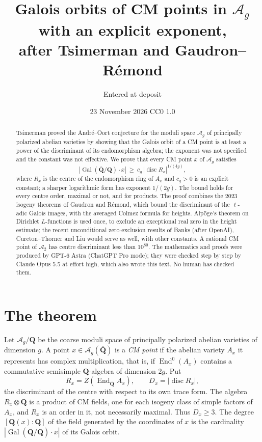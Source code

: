 \documentclass[11pt,a4paper]{article}
\title{Galois orbits of CM points in $\mathcal A_g$ with an explicit exponent,\\ after Tsimerman and Gaudron--R\'emond}
\author{Entered at deposit}
\date{23 November 2026 \quad CC0 1.0}
\theoremstyle{plain}
\theoremstyle{remark}
\newcommand{\Q}{\mathbf Q}
\newcommand{\Ag}{\mathcal A_g}
\newcommand{\Gal}{\operatorname{Gal}}
\newcommand{\End}{\operatorname{End}}
\newcommand{\disc}{\operatorname{disc}}
\newcommand{\Qb}{\overline{\mathbf Q}}
\begin{document}
\maketitle

\begin{abstract}
\noindent
Tsimerman proved the Andr\'e--Oort conjecture for the moduli space $\Ag$ of principally polarized abelian varieties
by showing that the Galois orbit of a CM point is at least a power of the discriminant of its endomorphism algebra;
the exponent was not specified and the constant was not effective. We prove that every CM point $x$ of $\Ag$ satisfies
\[
 |\Gal(\Qb/\Q)\cdot x|\ \geq\ c_g\,|\disc R_x|^{1/(4g)},
\]
where $R_x$ is the centre of the endomorphism ring of $A_x$ and $c_g>0$ is an explicit constant; a sharper logarithmic
form has exponent $1/(2g)$. The bound holds for every centre order, maximal or not, and for products. The proof
combines the 2023 isogeny theorems of Gaudron and R\'emond, which bound the discriminant of the $\ell$-adic Galois
images, with the averaged Colmez formula for heights. Alp\"oge's theorem on Dirichlet $L$-functions is used once, to
exclude an exceptional real zero in the height estimate; the recent unconditional zero-exclusion results of Banks
(after OpenAI), Cureton--Thorner and Liu would serve as well, with other constants. A rational CM point of
$\mathcal A_2$ has centre discriminant less than $10^{80}$. The mathematics and proofs were produced by GPT-6 Astra
(ChatGPT Pro mode); they were checked step by step by Claude Opus 5.5 at effort high, which also wrote this text. No
human has checked them.
\end{abstract}

\section{The theorem}

Let $\Ag/\Q$ be the coarse moduli space of principally polarized abelian varieties of dimension $g$. A point
$x\in\Ag(\Qb)$ is a \emph{CM point} if the abelian variety $A_x$ it represents has complex multiplication, that is,
if $\End^0(A_x)$ contains a commutative semisimple $\Q$-algebra of dimension $2g$. Put
\[
 R_x=Z(\End_{\Qb}A_x),\qquad D_x=|\disc R_x|,
\]
the discriminant of the centre with respect to its own trace form. The algebra $R_x\otimes\Q$ is a product of CM
fields, one for each isogeny class of simple factors of $A_x$, and $R_x$ is an order in it, not necessarily maximal.
Thus $D_x\geq3$. The degree $[\Q(x):\Q]$ of the field generated by the coordinates of $x$ is the cardinality
$|\Gal(\Qb/\Q)\cdot x|$ of its Galois orbit.
\end{document}
